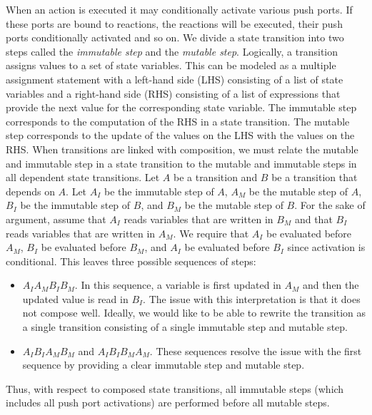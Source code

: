 When an action is executed it may conditionally activate various push ports.
If these ports are bound to reactions, the reactions will be executed, their push ports conditionally activated and so on.
We divide a state transition into two steps called the \emph{immutable step} and the \emph{mutable step}.
Logically, a transition assigns values to a set of state variables.
This can be modeled as a multiple assignment statement with a left-hand side (LHS) consisting of a list of state variables and a right-hand side (RHS) consisting of a list of expressions that provide the next value for the corresponding state variable.
The immutable step corresponds to the computation of the RHS in a state transition.
The mutable step corresponds to the update of the values on the LHS with the values on the RHS.
When transitions are linked with composition, we must relate the mutable and immutable step in a state transition to the mutable and immutable steps in all dependent state transitions.
Let $A$ be a transition and $B$ be a transition that depends on $A$.
Let $A_I$ be the immutable step of $A$, $A_M$ be the mutable step of $A$, $B_I$ be the immutable step of $B$, and $B_M$ be the mutable step of $B$.
For the sake of argument, assume that $A_I$ reads variables that are written in $B_M$ and that $B_I$ reads variables that are written in $A_M$.
We require that $A_I$ be evaluated before $A_M$, $B_I$ be evaluated before $B_M$, and $A_I$ be evaluated before $B_I$ since activation is conditional.
This leaves three possible sequences of steps:
\begin{itemize}
\item $A_I A_M B_I B_M$.  In this sequence, a variable is first updated in $A_M$ and then the updated value is read in $B_I$.  The issue with this interpretation is that it does not compose well.  Ideally, we would like to be able to rewrite the transition as a single transition consisting of a single immutable step and mutable step.
\item $A_I B_I A_M B_M$ and $A_I B_I B_M A_M$.  These sequences resolve the issue with the first sequence by providing a clear immutable step and mutable step.
\end{itemize}
Thus, with respect to composed state transitions, all immutable steps (which includes all push port activations) are performed before all mutable steps.

